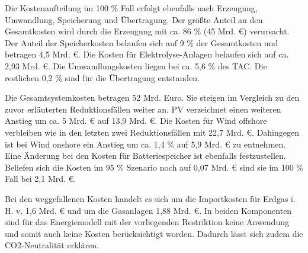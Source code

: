 Die Kostenaufteilung im 100 \% Fall erfolgt ebenfalls nach Erzeugung, Umwandlung, Speicherung und Übertragung. Der größte Anteil an den Gesamtkosten wird durch die Erzeugung mit ca. 86 \% (45 Mrd. €) verursacht. Der Anteil der Speicherkosten belaufen sich auf 9 \% der Gesamtkosten und betragen 4,5 Mrd. €. Die Kosten für Elektrolyse-Anlagen belaufen sich auf ca. 2,93 Mrd. €. Die Umwandlungskosten liegen bei ca. 5,6 \% des TAC. Die restlichen 0,2 \% sind für die Übertragung entstanden. 

Die Gesamtsystemkosten betragen 52 Mrd. Euro. Sie steigen im Vergleich zu den zuvor erläuterten Reduktionsfällen weiter an. PV verzeichnet einen weiteren Anstieg um ca. 5 Mrd. € auf 13,9 Mrd. €. Die Kosten für Wind offshore verbleiben wie in den letzten zwei Reduktionsfällen mit 22,7 Mrd. €. Dahingegen ist bei Wind onshore ein Anstieg um ca. 1,4 \% auf 5,9 Mrd. € zu entnehmen. Eine Änderung bei den Kosten für Batteriespeicher ist ebenfalls festzustellen. Beliefen sich die Kosten im 95 \% Szenario noch auf 0,07 Mrd. € sind sie im 100 \% Fall bei 2,1 Mrd. €. 

Bei den weggefallenen Kosten handelt es sich um die Importkosten für Erdgas i. H. v. 1,6 Mrd. € und um die Gasanlagen 1,88 Mrd. €. In beiden Komponenten sind für das Energiemodell mit der vorliegenden Restriktion keine Anwendung und somit auch keine Kosten berücksichtigt worden. Dadurch lässt sich zudem die CO2-Neutralität erklären.

